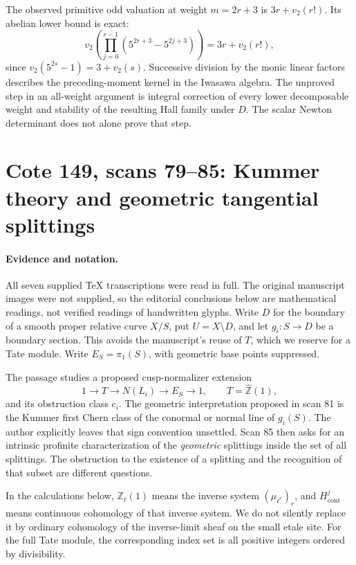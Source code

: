 \documentclass[11pt,a4paper]{article}
\theoremstyle{definition}
\begin{document}
The observed primitive odd valuation at weight $m=2r+3$ is
$3r+v_2(r!)$. Its abelian lower bound is exact:
\[
 v_2\!\left(\prod_{j=0}^{r-1}
 (5^{2r+3}-5^{2j+3})\right)=3r+v_2(r!),
\]
since $v_2(5^{2s}-1)=3+v_2(s)$. Successive division by the
monic linear factors describes the preceding-moment kernel
in the Iwasawa algebra. The unproved step in an all-weight
argument is integral correction of every lower decomposable
weight and stability of the resulting Hall family under $D$.
The scalar Newton determinant does not alone prove that step.

\section{Cote 149, scans 79--85: Kummer theory and geometric tangential splittings}
\label{sec:archive-kummer}

\paragraph{Evidence and notation.}
All seven supplied TeX transcriptions were read in full.  The original
manuscript images were not supplied, so the editorial conclusions below are
mathematical readings, not verified readings of handwritten glyphs.  Write
\(D\) for the boundary of a smooth proper relative curve \(X/S\), put
\(U=X\setminus D\), and let \(g_i:S\longrightarrow D\) be a boundary section.
This avoids the manuscript's reuse of \(T\), which we reserve for a Tate module.
Write \(E_S=\pi_1(S)\), with geometric base points suppressed.

The passage studies a proposed cusp-normalizer extension
\begin{equation}\label{eq:arc-normalizer}
 1\longrightarrow T\longrightarrow N(L_i)
   \longrightarrow E_S\longrightarrow 1,
 \qquad T=\widehat{\mathbb Z}(1),
\end{equation}
and its obstruction class \(c_i\).  The geometric interpretation proposed in
scan 81 is the Kummer first Chern class of the conormal or normal line of
\(g_i(S)\).  The author explicitly leaves that sign convention unsettled.
Scan 85 then asks for an intrinsic profinite characterization of the
\emph{geometric} splittings inside the set of all splittings.  The obstruction
to the existence of a splitting and the recognition of that subset are
different questions.

In the calculations below, \(\mathbb Z_\ell(1)\) means the inverse system
\((\mu_{\ell^r})_r\), and \(H^j_{\mathrm{cont}}\) means continuous
cohomology of that inverse system.  We do not silently replace it by
ordinary cohomology of the inverse-limit sheaf on the small etale site.
For the full Tate module, the corresponding index set is all positive
integers ordered by divisibility.
\end{document}

